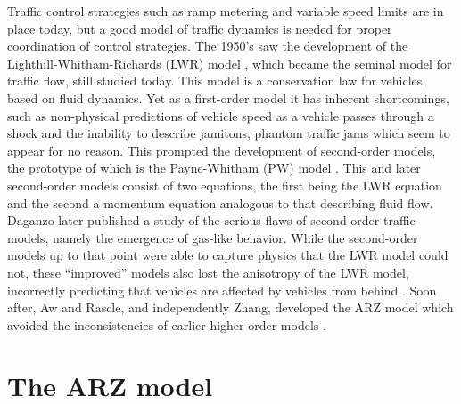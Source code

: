 \documentclass[preprint]{elsarticle}
\begin{document}
Traffic control strategies such as ramp metering and variable speed limits are in place today, but a good model of traffic dynamics is needed for proper coordination of control strategies. The 1950’s saw the development of the Lighthill-Whitham-Richards (LWR) model \cite{LW} \cite{Richards}, which became the seminal model for traffic flow, still studied today. This model is a conservation law for vehicles, based on fluid dynamics. Yet as a first-order model it has inherent shortcomings, such as non-physical predictions of vehicle speed as a vehicle passes through a shock and the inability to describe jamitons, phantom traffic jams which seem to appear for no reason. This prompted the development of second-order models, the prototype of which is the Payne-Whitham (PW) model \cite{payne1971models} \cite{whitham1974linear}. This and later second-order models consist of two equations, the first being the LWR equation and the second a momentum equation analogous to that describing fluid flow. Daganzo later published a study of the serious flaws of second-order traffic models, namely the emergence of gas-like behavior. While the second-order models up to that point were able to capture physics that the LWR model could not, these “improved” models also lost the anisotropy of the LWR model, incorrectly predicting that vehicles are affected by vehicles from behind \cite{Dag_requiem}. Soon after, Aw and Rascle, and independently Zhang, developed the ARZ model which avoided the inconsistencies of earlier higher-order models \cite{AR} \cite{Z}. 




\section{The ARZ model}

\end{document}
